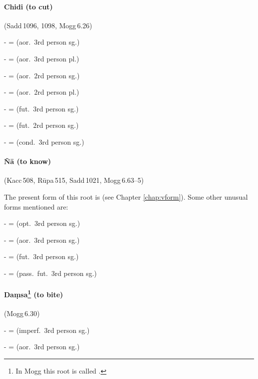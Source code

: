 \paragraph*{Chidi (to cut)} (Sadd\,1096, 1098, Mogg\,6.26)\par
-  =  (aor.\ 3rd person sg.)\par
-  =  (aor.\ 3rd person pl.)\par
-  =  (aor.\ 2rd person sg.)\par
-  =  (aor.\ 2rd person pl.)\par
-  =  (fut.\ 3rd person sg.)\par
-  =  (fut.\ 2rd person sg.)\par
-  =  (cond.\ 3rd person sg.)\par

\paragraph*{\~N\=a (to know)} (Kacc\,508, R\=upa\,515, Sadd\,1021, Mogg\,6.63--5)

The present form of this root is  (see Chapter \ref{chap:vform}). Some other unusual forms mentioned are:\par
-  =  (opt.\ 3rd person sg.)\par
-  =  (aor.\ 3rd person sg.)\par
-  =  (fut.\ 3rd person sg.)\par
-  =  (pass.\ fut.\ 3rd person sg.)\par

\paragraph*{Da\d msa\footnote{In Mogg this root is called .} (to bite)} (Mogg\,6.30)\par
-  =  (imperf.\ 3rd person sg.)\par
-  =  (aor.\ 3rd person sg.)\par

